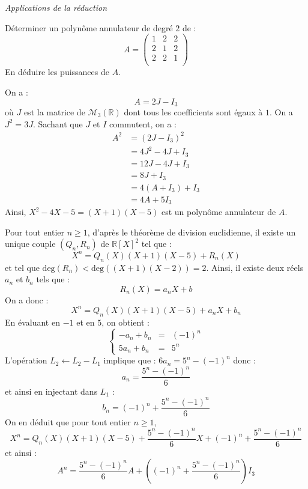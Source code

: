\documentclass[a4paper,10pt]{report}
\begin{document}
\begin{center}
\textit{{ {\large Applications de la réduction}}}
\end{center}

\medskip

\begin{Exa} Déterminer un polynôme annulateur de degré $2$ de :
$$ A = \begin{pmatrix}
1 & 2 & 2 \\
2 & 1 & 2 \\
2 & 2 & 1 \\
\end{pmatrix}$$
En déduire les puissances de $A$. 
\end{Exa}

\corr On a :
$$ A= 2J-I_3$$
où $J$ est la matrice de $\mathcal{M}_3(\mathbb{R})$ dont tous les coefficients sont égaux à $1$. On a $J^2=3J$. Sachant que $J$ et $I$ commutent, on a :
\begin{align*}
A^2 & = (2J-I_3)^2 \\
& = 4J^2 - 4J+ I_3 \\
& = 12J-4J+I_3 \\
& = 8J+I_3 \\
& = 4(A+I_3) + I_3 \\
& = 4A +5I_3
\end{align*}
Ainsi, $X^2-4X-5=(X+1)(X-5)$ est un polynôme annulateur de $A$.

\medskip

\noindent Pour tout entier $n \geq 1$, d'après le théorème de division euclidienne, il existe un unique couple $(Q_n,R_n)$ de $\mathbb{R}[X]^2$ tel que :
$$ X^n = Q_n(X) (X+1)(X-5) + R_n(X)$$
et tel que $\textrm{deg}(R_n)<\textrm{deg}((X+1)(X-2))=2$. Ainsi, il existe deux réels $a_n$ et $b_n$ tels que :
$$ R_n(X)= a_n X + b$$
On a donc :
$$ X^n = Q_n(X) (X+1)(X-5) + a_n X + b_n$$
En évaluant en $-1$ et en $5$, on obtient :
$$ \left\lbrace \begin{array}{ccl}
-a_n + b_n & = & (-1)^n \\
5a_n + b_n & = & 5^n
\end{array}\right.$$
L'opération $L_2 \leftarrow L_2- L_1$ implique que : $6 a_n = 5^n - (-1)^n$ donc :
$$ a_n = \dfrac{5^n-(-1)^n}{6}$$
et ainsi en injectant dans $L_1$ :
$$ b_n = (-1)^n + \dfrac{5^n-(-1)^n}{6}$$
On en déduit que pour tout entier $n \geq 1$,
$$ X^n = Q_n(X) (X+1)(X-5) +\dfrac{5^n-(-1)^n}{6}  X + (-1)^n + \dfrac{5^n-(-1)^n}{6}$$
et ainsi :
$$ A^n = \dfrac{5^n-(-1)^n}{6}  A + \left((-1)^n + \dfrac{5^n-(-1)^n}{6}\right) I_3$$
\end{document}
